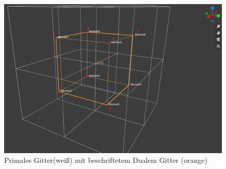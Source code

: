 \begin{figure}[h]
	\centering
	\includegraphics[width=\textwidth]{data/VolumenDualVertex}
	\caption{Primales Gitter(weiß) mit beschriftetem Dualem Gitter (orange)}
	\label{fig:dual}
\end{figure}
            	
